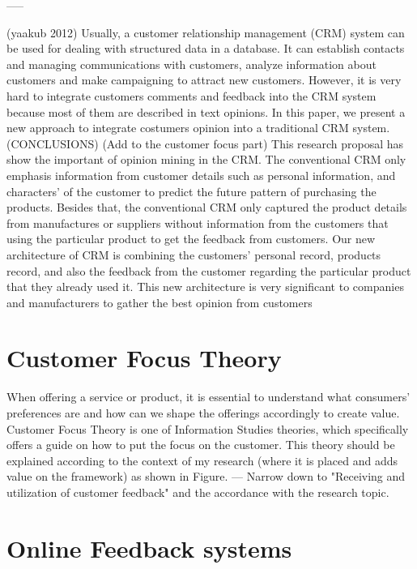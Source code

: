 \documentclass[a4paper, 11pt]{article}
\begin{document}
-----

(yaakub 2012) Usually, a customer relationship management (CRM) system
can be used for dealing with structured data in a database. It can establish contacts and managing communications with
customers, analyze information about customers and make
campaigning to attract new customers. However, it is very hard
to integrate customers comments and feedback into the CRM
system because most of them are described in text opinions. In this paper, we present a new approach to integrate costumers opinion into a traditional CRM system. (CONCLUSIONS) (Add to the customer focus part) This research proposal has show the important of opinion mining in the CRM. The conventional CRM only emphasis information
from customer details such as personal information,
and characters’ of the customer to predict the future pattern
of purchasing the products. Besides that, the conventional
CRM only captured the product details from manufactures or
suppliers without information from the customers that using
the particular product to get the feedback from customers.
Our new architecture of CRM is combining the customers’
personal record, products record, and also the feedback from
the customer regarding the particular product that they already
used it. This new architecture is very significant to companies
and manufacturers to gather the best opinion from customers

\section{Customer Focus Theory}
\label{sec:CFTH}

When offering a service or product, it is essential to understand what consumers' preferences are and how can we shape the offerings accordingly to create value. Customer Focus Theory is one of Information Studies theories, which specifically offers a guide on how to put the focus on the customer. This theory should be explained according to the context of my research (where it is placed and adds value on the framework) as shown in Figure. 
--- Narrow down to "Receiving and utilization of customer feedback" and the accordance with the research topic.


\section{Online Feedback systems}
\end{document}
